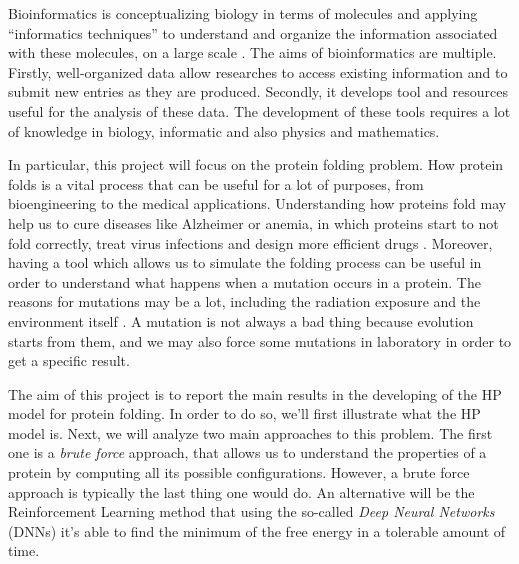 Bioinformatics is conceptualizing biology in terms of molecules and applying ``informatics techniques'' to understand and organize the information associated with these molecules, on a large scale \cite{bioinfo}.
The aims of bioinformatics are multiple.
Firstly, well-organized data allow researches to access existing information and to submit new entries as they are produced.
Secondly, it develops tool and resources useful for the analysis of these data.
The development of these tools requires a lot of knowledge in biology, informatic and also physics and mathematics.

In particular, this project will focus on the protein folding problem.
How protein folds is a vital process that can be useful for a lot of purposes, from bioengineering to the medical applications.
Understanding how proteins fold may help us to cure diseases like Alzheimer or anemia, in which proteins start to not fold correctly, treat virus infections and design more efficient drugs \cite{PERM}. 
Moreover, having a tool which allows us to simulate the folding process can be useful in order to understand what happens when a mutation occurs in a protein.
The reasons for mutations may be a lot, including the radiation exposure and the environment itself \cite{zanichelli}.
A mutation is not always a bad thing because evolution starts from them, and we may also force some mutations in laboratory in order to get a specific result.

The aim of this project is to report the main results in the developing of the HP model for protein folding.
In order to do so, we'll first illustrate what the HP model is.
Next, we will analyze two main approaches to this problem.
The first one is a \emph{brute force} approach, that allows us to understand the properties of a protein by computing all its possible configurations.
However, a brute force approach is typically the last thing one would do.
An alternative will be the Reinforcement Learning method that using the so-called \emph{Deep Neural Networks} (DNNs) it's able to find the minimum of the free energy in a tolerable amount of time.